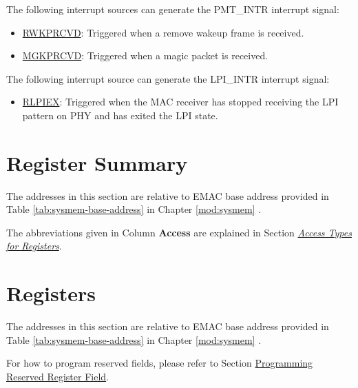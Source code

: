 \documentclass[main\_\_EN.tex]{subfiles}
\begin{document}
The following interrupt sources can generate the PMT\_INTR interrupt signal:
\begin{itemize}
\item \hyperref[regdesc:PMTCSRREG]{RWKPRCVD}: Triggered when a remove wakeup frame is received.
\item \hyperref[regdesc:PMTCSRREG]{MGKPRCVD}: Triggered when a magic packet is received.
\end{itemize}

The following interrupt source can generate the LPI\_INTR interrupt signal:

\begin{itemize}
\item \hyperref[regdesc:EMACLPICSRREG]{RLPIEX}: Triggered when the MAC receiver has stopped receiving the LPI pattern on PHY and has exited the LPI state.
\end{itemize}





\newpage
\hypertarget{ethernetmac-reg-summ}{}
\section{Register Summary}
\label{sec:ethernetmac-reg-summ}

The addresses in this section are relative to EMAC base address provided in Table \ref{tab:sysmem-base-address} in Chapter \ref{mod:sysmem} \textit{}.

The abbreviations given in Column \textbf{Access} are explained in Section \hyperref[glossary-access-types]{\textit{Access Types for Registers}}.






\newpage
\section{Registers}

The addresses in this section are relative to EMAC base address provided in Table \ref{tab:sysmem-base-address} in Chapter \ref{mod:sysmem} \textit{}.

For how to program reserved fields, please refer to Section \hyperref[programming-reserved-field]{Programming Reserved Register Field}.


\end{document}
